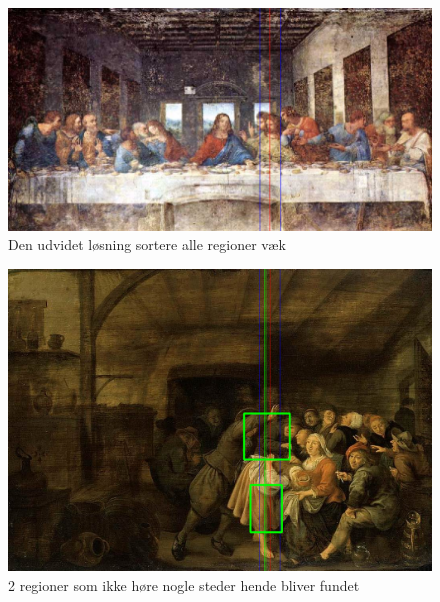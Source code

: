 \begin{figure}[h!!]
	\begin{center}
		\includegraphics[scale=0.3,angle=0]{afsnit/afprovning/billeder/udvidet_losning/udvidet_mfarver_mdetaljer.png}
	\end{center}
	\caption[]{Den udvidet løsning sortere alle regioner væk}
	\label{udvidet_virker_ikke2}
\end{figure}

\begin{figure}[h!!]
	\begin{center}
		\includegraphics[scale=0.3,angle=0]{afsnit/afprovning/billeder/udvidet_losning/udvidet_sfarver_mdetaljer.png}
	\end{center}
	\caption[]{2 regioner som ikke høre nogle steder hende bliver fundet}
	\label{udvidet_virker_ikke3}
\end{figure}
\clearpage

